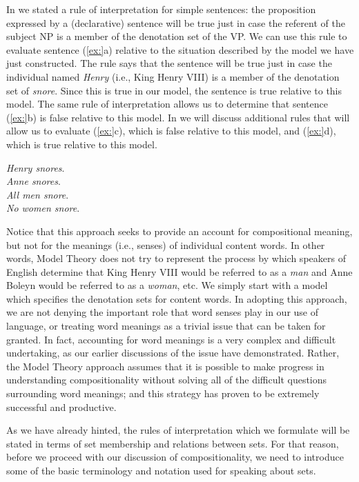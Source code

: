 In  we stated a rule of interpretation for simple sentences: the proposition expressed by a (declarative) sentence will be true just in case the referent of the subject NP is a member of the denotation set of the VP. We can use this rule to evaluate sentence (\ref{ex:}a) relative to the situation described by the model we have just constructed. The rule says that the sentence will be true just in case the individual named \textit{Henry} (i.e., King Henry VIII) is a member of the denotation set of \textit{snore}. Since this is true in our model, the sentence is true relative to this model. The same rule of interpretation allows us to determine that sentence (\ref{ex:}b) is false relative to this model. In  we will discuss additional rules that will allow us to evaluate (\ref{ex:}c), which is false relative to this model, and (\ref{ex:}d), which is true relative to this model.


\ea
\ea \textit{Henry snores}.\\
\ex \textit{Anne snores}.\\
\ex \textit{All men snore}.\\
\ex \textit{No women snore}.
                       \z
\z


Notice that this approach seeks to provide an account for compositional meaning, but not for the meanings (i.e., senses) of individual content words. In other words, Model Theory does not try to represent the process by which speakers of English determine that King Henry VIII would be referred to as a \textit{man} and Anne Boleyn would be referred to as a \textit{woman}, etc. We simply start with a model which specifies the denotation sets for content words. In adopting this approach, we are not denying the important role that word senses play in our use of language, or treating word meanings as a trivial issue that can be taken for granted. In fact, accounting for word meanings is a very complex and difficult undertaking, as our earlier discussions of the issue have demonstrated. Rather, the Model Theory approach assumes that it is possible to make progress in understanding compositionality without solving all of the difficult questions surrounding word meanings; and this strategy has proven to be extremely successful and productive.



As we have already hinted, the rules of interpretation which we formulate will be stated in terms of set membership and relations between sets. For that reason, before we proceed with our discussion of compositionality, we need to introduce some of the basic terminology and notation used for speaking about sets.


